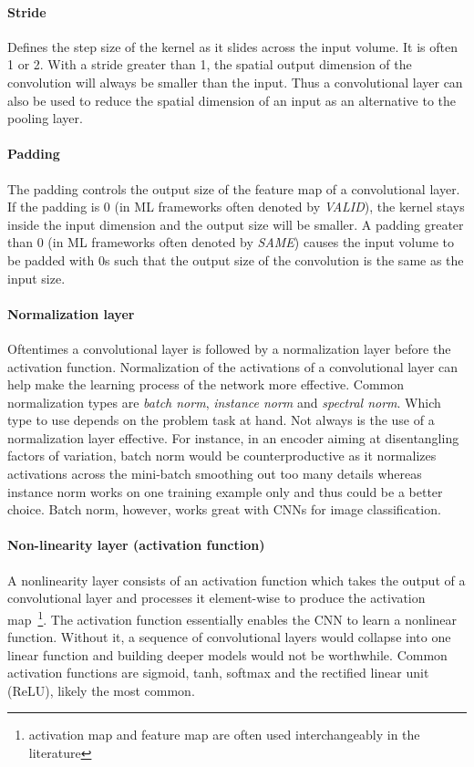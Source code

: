 \documentclass[a4paper,12pt]{report}
\begin{document}
\paragraph{Stride                   } Defines the step size of the kernel as it slides across the input volume. It is often 1 or 2. With a stride greater than 1, the spatial output dimension of the convolution will always be smaller than the input. Thus a convolutional layer can also be used to reduce the spatial dimension of an input as an alternative to the pooling layer.

\paragraph{Padding					} The padding controls the output size of the feature map of a convolutional layer. If the padding is 0 (in ML frameworks often denoted by \textit{VALID}), the kernel stays inside the input dimension and the output size will be smaller. A padding greater than 0 (in ML frameworks often denoted by \textit{SAME}) causes the input volume to be padded with 0s such that the output size of the convolution is the same as the input size.

\paragraph{Normalization layer      } Oftentimes a convolutional layer is followed by a normalization layer before the activation function. Normalization of the activations of a convolutional layer can help make the learning process of the network more effective. Common normalization types are \textit{batch norm}, \textit{instance norm} and \textit{spectral norm}. Which type to use depends on the problem task at hand. Not always is the use of a normalization layer effective. For instance, in an encoder aiming at disentangling factors of variation, batch norm would be counterproductive as it normalizes activations across the mini-batch smoothing out too many details whereas instance norm works on one training example only and thus could be a better choice. Batch norm, however, works great with CNNs for image classification.

\paragraph{Non-linearity layer (activation function)} A nonlinearity layer consists of an activation function which takes the output of a convolutional layer and processes it element-wise to produce the activation map~\footnote{activation map and feature map are often used interchangeably in the literature}. The activation function essentially enables the CNN to learn a nonlinear function. Without it, a sequence of convolutional layers would collapse into one linear function and building deeper models would not be worthwhile. Common activation functions are sigmoid, tanh, softmax and the rectified linear unit (ReLU), likely the most common. 
\end{document}
